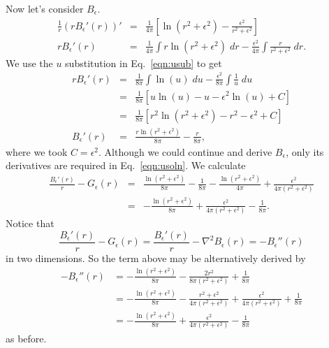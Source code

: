 \documentclass[12pt]{article}
\newcommand{\bees}[1]{\begin{equation*} #1 \end{equation*}}
\newcommand{\baas}[1]{\begin{eqnarray*} #1 \end{eqnarray*}}
\newcommand{\Ge}{G_\epsilon}
\newcommand{\Be}{B_\epsilon}
\newcommand{\eps}{\epsilon}
\begin{document}
Now let's consider $\Be$.
\baas{
\frac{1}{r}\left( r \Be'(r) \right)' &=& \frac{1}{4\pi} \left[ \ln(r^2 + \eps^2) -  \frac{\eps^2}{r^2 + \eps^2} \right] \\
 r \Be'(r) &=& \frac{1}{4\pi} \int r \ln(r^2 + \eps^2) \; dr - \frac{\eps^2}{4\pi} \int \frac{r}{r^2 + \eps^2} \; dr .
}
We use the $u$ substitution in Eq.~\eqref{eqn:usub} to get
\baas{
r \Be'(r) &=& \frac{1}{8\pi} \int \ln(u) \; du - \frac{\eps^2}{8\pi} \int \frac{1}{u} \; du \\
&=& \frac{1}{8\pi} \left[ u\ln(u) - u -\eps^2 \ln(u) + C \right] \\
&=& \frac{1}{8\pi} \left[ r^2 \ln(r^2 + \eps^2) - r^2 - \eps^2 + C \right] \\
\Be'(r) &=& \frac{r \ln(r^2 + \eps^2)}{8\pi} - \frac{r}{8\pi},
}
where we took $C = \eps^2$. Although we could continue and derive $\Be$, only its derivatives are required in Eq.~\eqref{eqn:usoln}. We calculate
\baas{
\frac{\Be'(r)}{r} - \Ge(r) &=& \frac{\ln(r^2 + \eps^2)}{8\pi} - \frac{1}{8\pi} - \frac{\ln(r^2 + \eps^2)}{4\pi} + \frac{\eps^2}{4\pi(r^2 + \eps^2)} \\
&=& - \frac{\ln(r^2 + \eps^2)}{8\pi}  + \frac{\eps^2}{4\pi(r^2 + \eps^2)} - \frac{1}{8\pi}.
}
Notice that
\bees{
	\frac{\Be'(r)}{r} - \Ge(r) = \frac{\Be'(r)}{r} - \nabla^2\Be(r) = - \Be''(r)
}
in two dimensions. So the term above may be alternatively derived by
\begin{align*}
	- \Be''(r) & = -\frac{ \ln(r^2 + \eps^2)}{8\pi} - \frac{2r^2}{8\pi(r^2 + \eps^2)} + \frac{1}{8\pi} \\
	& = -\frac{ \ln(r^2 + \eps^2)}{8\pi} - \frac{r^2 + \eps^2}{4\pi(r^2 + \eps^2)} + \frac{\eps^2}{4\pi(r^2 + \eps^2)} + \frac{1}{8\pi} \\
	& = -\frac{ \ln(r^2 + \eps^2)}{8\pi} + \frac{\eps^2}{4\pi(r^2 + \eps^2)} - \frac{1}{8\pi}
\end{align*}
as before.
\end{document}
